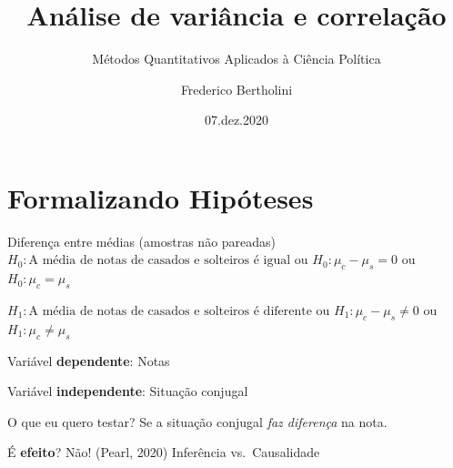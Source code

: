 \documentclass[
  9pt,
  ignorenonframetext,
  aspectratio=169]{beamer}
\title{Análise de variância e correlação}
\subtitle{Métodos Quantitativos Aplicados à Ciência Política}
\author{Frederico Bertholini}
\date{07.dez.2020}
\begin{document}
\frame{\titlepage}

\begin{frame}[allowframebreaks]
  \tableofcontents[hideallsubsections]
\end{frame}
\hypertarget{formalizando-hipuxf3teses}{%
\section{Formalizando Hipóteses}\label{formalizando-hipuxf3teses}}

\begin{frame}{Diferença entre médias (amostras não pareadas)}
\protect\hypertarget{diferenuxe7a-entre-muxe9dias-amostras-nuxe3o-pareadas}{}
\(H_0:\text{A média de notas de casados e solteiros é igual}\) ou
\(H_0:\mu_c-\mu_s=0\) ou \(H_0:\mu_c = \mu_s\)

\(H_1:\text{A média de notas de casados e solteiros é diferente}\) ou
\(H_1:\mu_c-\mu_s \neq 0\) ou \(H_1:\mu_c \neq \mu_s\)

Variável \textbf{dependente}: Notas

Variável \textbf{independente}: Situação conjugal

O que eu quero testar? Se a situação conjugal \emph{faz diferença} na
nota.

É \textbf{efeito}? Não! (Pearl, 2020) Inferência vs.~Causalidade
\end{frame}
\end{document}
